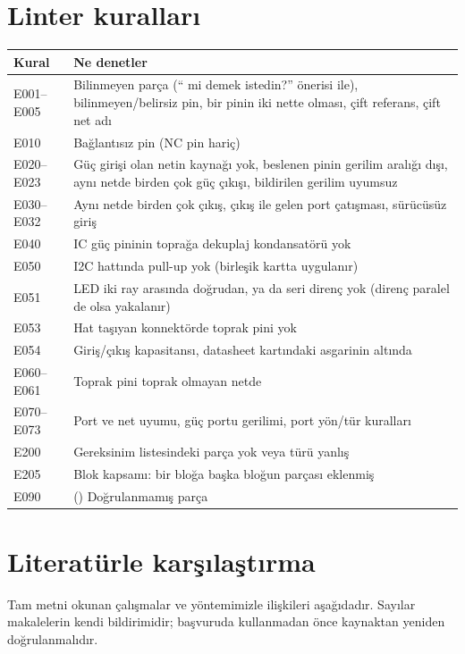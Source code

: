 \documentclass[11pt,a4paper]{article}
\newcommand{\code}[1]{\texttt{\detokenize{#1}}}
\begin{document}
\section{Linter kuralları}
\begin{longtable}{@{}p{1.7cm}p{14cm}@{}}
\toprule \textbf{Kural} & \textbf{Ne denetler} \\ \midrule \endhead
E001--E005 & Bilinmeyen parça (``\code{Device:R} mi demek istedin?'' önerisi ile), bilinmeyen/belirsiz pin, bir pinin iki nette olması, çift referans, çift net adı \\
E010 & Bağlantısız pin (NC pin hariç) \\
E020--E023 & Güç girişi olan netin kaynağı yok, beslenen pinin gerilim aralığı dışı, aynı netde birden çok güç çıkışı, bildirilen gerilim uyumsuz \\
E030--E032 & Aynı netde birden çok çıkış, çıkış ile gelen port çatışması, sürücüsüz giriş \\
E040 & IC güç pininin toprağa dekuplaj kondansatörü yok \\
E050 & I2C hattında pull-up yok (birleşik kartta uygulanır) \\
E051 & LED iki ray arasında doğrudan, ya da seri direnç yok (direnç paralel de olsa yakalanır) \\
E053 & Hat taşıyan konnektörde toprak pini yok \\
E054 & Giriş/çıkış kapasitansı, datasheet kartındaki asgarinin altında \\
E060--E061 & Toprak pini toprak olmayan netde \\
E070--E073 & Port ve net uyumu, güç portu gerilimi, port yön/tür kuralları \\
E200 & Gereksinim listesindeki parça yok veya türü yanlış \\
E205 & Blok kapsamı: bir bloğa başka bloğun parçası eklenmiş \\
E090 & (\code{--strict}) Doğrulanmamış parça \\ \bottomrule
\end{longtable}

\section{Literatürle karşılaştırma}
Tam metni okunan çalışmalar ve yöntemimizle ilişkileri aşağıdadır. Sayılar makalelerin kendi bildirimidir; başvuruda kullanmadan önce kaynaktan yeniden doğrulanmalıdır.
\end{document}
